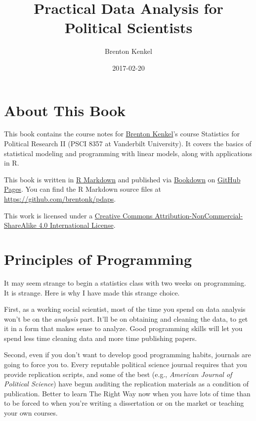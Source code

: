 \documentclass[12pt,oneside,openany]{book}
\title{Practical Data Analysis for Political Scientists}
\author{Brenton Kenkel}
\date{2017-02-20}
\begin{document}
\maketitle

{
\setcounter{tocdepth}{1}
\tableofcontents
}
\chapter{About This Book}\label{about-this-book}

This book contains the course notes for
\href{http://bkenkel.com}{Brenton Kenkel}'s course Statistics for
Political Research II (PSCI 8357 at Vanderbilt University). It covers
the basics of statistical modeling and programming with linear models,
along with applications in R.

This book is written in \href{http://rmarkdown.rstudio.com}{R Markdown}
and published via \href{https://bookdown.org}{Bookdown} on
\href{https://pages.github.com}{GitHub Pages}. You can find the R
Markdown source files at \url{https://github.com/brentonk/pdaps}.

This work is licensed under a
\href{http://creativecommons.org/licenses/by-nc-sa/4.0/}{Creative
Commons Attribution-NonCommercial-ShareAlike 4.0 International License}.

\hypertarget{programming}{\chapter{Principles of
Programming}\label{programming}}

It may seem strange to begin a statistics class with two weeks on
programming. It is strange. Here is why I have made this strange choice.

First, as a working social scientist, most of the time you spend on data
analysis won't be on the \emph{analysis} part. It'll be on obtaining and
cleaning the data, to get it in a form that makes sense to analyze. Good
programming skills will let you spend less time cleaning data and more
time publishing papers.

Second, even if you don't want to develop good programming habits,
journals are going to force you to. Every reputable political science
journal requires that you provide replication scripts, and some of the
best (e.g., \emph{American Journal of Political Science}) have begun
auditing the replication materials as a condition of publication. Better
to learn The Right Way now when you have lots of time than to be forced
to when you're writing a dissertation or on the market or teaching your
own courses.
\end{document}
